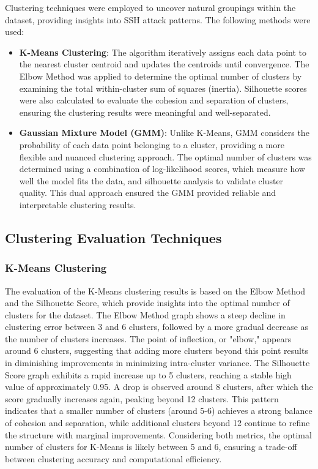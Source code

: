         Clustering techniques were employed to uncover natural groupings within the dataset, providing insights into SSH attack patterns. The following methods were used:
        
        \begin{itemize}
        
            \item \textbf{K-Means Clustering}: The algorithm iteratively assigns each data point to the nearest cluster centroid and updates the centroids until convergence. The Elbow Method was applied to determine the optimal number of clusters by examining the total within-cluster sum of squares (inertia). Silhouette scores were also calculated to evaluate the cohesion and separation of clusters, ensuring the clustering results were meaningful and well-separated.
            
            \item \textbf{Gaussian Mixture Model (GMM)}: Unlike K-Means, GMM considers the probability of each data point belonging to a cluster, providing a more flexible and nuanced clustering approach. The optimal number of clusters was determined using a combination of log-likelihood scores, which measure how well the model fits the data, and silhouette analysis to validate cluster quality. This dual approach ensured the GMM provided reliable and interpretable clustering results.
            
        \end{itemize}
        
    \subsection{Clustering Evaluation Techniques}
    
        \subsubsection{K-Means Clustering \\}
            
            The evaluation of the K-Means clustering results is based on the Elbow Method and the Silhouette Score, which provide insights into the optimal number of clusters for the dataset. The Elbow Method graph shows a steep decline in clustering error between 3 and 6 clusters, followed by a more gradual decrease as the number of clusters increases. The point of inflection, or "elbow," appears around 6 clusters, suggesting that adding more clusters beyond this point results in diminishing improvements in minimizing intra-cluster variance. The Silhouette Score graph exhibits a rapid increase up to 5 clusters, reaching a stable high value of approximately 0.95. A drop is observed around 8 clusters, after which the score gradually increases again, peaking beyond 12 clusters. This pattern indicates that a smaller number of clusters (around 5-6) achieves a strong balance of cohesion and separation, while additional clusters beyond 12 continue to refine the structure with marginal improvements. Considering both metrics, the optimal number of clusters for K-Means is likely between 5 and 6, ensuring a trade-off between clustering accuracy and computational efficiency.
        
